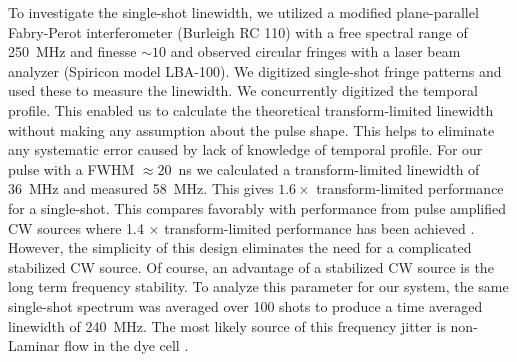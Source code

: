 To investigate the single-shot linewidth, we utilized a modified
plane-parallel Fabry-Perot interferometer (Burleigh RC 110) with a free
spectral range of 250~MHz and finesse $\sim 10$ and observed circular fringes
with a laser beam analyzer (Spiricon model LBA-100).  We digitized
single-shot fringe patterns and used these to measure the linewidth. We
concurrently digitized the temporal profile.  This enabled us to calculate
the theoretical transform-limited linewidth without making any assumption about
the pulse shape. This helps to eliminate any systematic error caused by lack of
knowledge of temporal profile.  For our pulse with a FWHM
$\approx 20$~ns we calculated a transform-limited linewidth of 36~MHz and
measured 58~MHz.  This gives $1.6 \times$ transform-limited performance for a
single-shot.  This compares favorably with performance from pulse amplified CW
sources where 1.4 $\times$ transform-limited performance has been achieved
\cite{Black:94}.  However, the simplicity of this design eliminates the need
for a complicated stabilized CW source.  Of course, an advantage of
a stabilized CW source is the long term frequency stability.  To analyze
this parameter for our system, the same single-shot spectrum was averaged
over 100 shots to produce a time averaged linewidth of 240~MHz.  The
most likely source of this frequency jitter is non-Laminar flow in the dye
cell \cite{Maruyama:91}.

\begin{figure}[tb]
\bigskip
{}
\end{figure}

